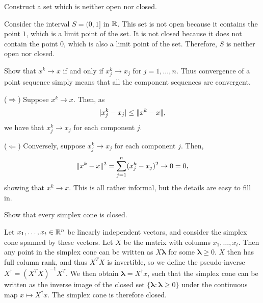 \begin{exercise}
  Construct a set which is neither open nor closed.
\end{exercise}

\begin{solution}
  Consider the interval $S = (0, 1]$ in $\mathbb{R}$. %
  This set is not open because it contains the point $1$, which is a limit point of the set.
  It is not closed because it does not contain the point $0$, which is also a limit point of the set.
  Therefore, $S$ is neither open nor closed.
\end{solution}

\begin{exercise}
  Show that $x^k \to x$ if and only if $x_j^k \to x_j$ for $j = 1, \ldots, n$.
  Thus convergence of a point sequence simply means that all the component sequences are convergent.
\end{exercise}

\begin{solution}
  ($\Rightarrow$) Suppose $x^k \to x$.
  Then, as
  \begin{equation}
    \lvert x_j^k - x_j\rvert \leq \lVert x^k - x\rVert,
  \end{equation}
  we have that $x_j^k \to x_j$ for each component $j$.

  ($\Leftarrow$) Conversely, suppose $x_j^k \to x_j$ for each component $j$.
  Then,
  \begin{equation}
    \lVert x^k - x\rVert^2 = \sum_{j = 1}^{n} (x_j^k - x_j)^2 \to 0 = 0,
  \end{equation}
  showing that $x^k \to x$.
  This is all rather informal, but the details are easy to fill in.
\end{solution}

\begin{exercise}
  Show that every simplex cone is closed.
\end{exercise}

\begin{solution}
  Let $x_1, \ldots, x_t \in \mathbb{R}^n$ be linearly independent vectors, and consider the simplex cone spanned by these vectors.
  Let $X$ be the matrix with columns $x_1, \ldots, x_t$.
  Then any point in the simplex cone can be written as $X \boldsymbol{\lambda}$ for some $\boldsymbol{\lambda} \geq 0$.
  $X$ then has full column rank, and thus $X^T X$ is invertible, so we define the pseudo-inverse $X^\dagger = (X^T X)^{-1} X^T$.
  We then obtain $\boldsymbol{\lambda} = X^\dagger x$, such that the simplex cone can be written as the inverse image of the closed set $\{ \boldsymbol{\lambda} : \boldsymbol{\lambda} \geq 0 \}$ under the continuous map $x \mapsto X^\dagger x$.
  The simplex cone is therefore closed.
\end{solution}

